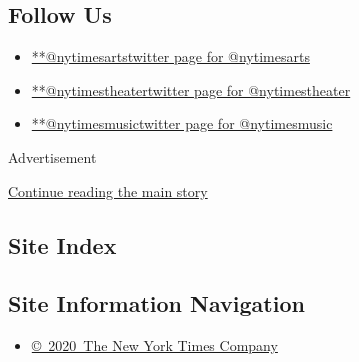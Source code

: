 \hypertarget{follow-us}{%
\subsection{Follow Us}\label{follow-us}}

\begin{itemize}
\tightlist
\item
  \href{https://twitter.com/nytimesarts}{**@nytimesartstwitter page for
  @nytimesarts}
\item
  \href{https://twitter.com/nytimestheater}{**@nytimestheatertwitter
  page for @nytimestheater}
\item
  \href{https://twitter.com/nytimesmusic}{**@nytimesmusictwitter page
  for @nytimesmusic}
\end{itemize}

Advertisement

\protect\hyperlink{after-mktg}{Continue reading the main story}

\hypertarget{site-index}{%
\subsection{Site Index}\label{site-index}}

\hypertarget{site-information-navigation}{%
\subsection{Site Information
Navigation}\label{site-information-navigation}}

\begin{itemize}
\tightlist
\item
  \href{https://help.nytimes.com/hc/en-us/articles/115014792127-Copyright-notice}{©~2020~The
  New York Times Company}
\end{itemize}

